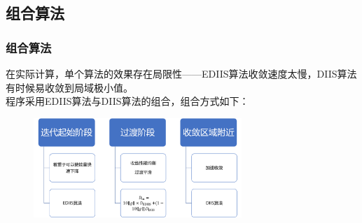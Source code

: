 \documentclass[10pt,aspectratio=43,mathserif,UTF8]{beamer}
\begin{document}
\subsection{组合算法}
\begin{frame}
	\frametitle{组合算法}
	在实际计算，单个算法的效果存在局限性——EDIIS算法收敛速度太慢，DIIS算法有时候易收敛到局域极小值。\\
	程序采用EDIIS算法与DIIS算法的组合，组合方式如下：
	
	\begin{figure}[htbp]
		\centering
		\includegraphics[width=0.7\textwidth]{figure/HF/idea3.png}
	\end{figure}
	

	
\end{frame}
\end{document}
